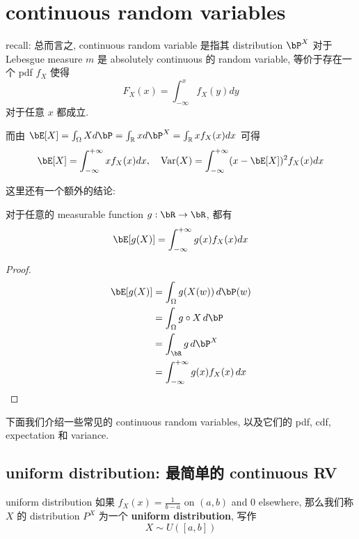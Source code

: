 \section{continuous random variables}
recall: 总而言之, continuous random variable 是指其 distribution \(\bP^X\)
对于 Lebesgue measure \(m\) 是 absolutely continuous 的 random variable, 
等价于存在一个 pdf \(f_X\) 使得\[
F_X(x) = \int_{-\infty}^x f_X(y) dy 
\] 对于任意 \(x\) 都成立.

而由 \( \bE[X]= \int_{\Omega} X d\bP = \int_{\mathbb{R}} x d\bP^X = \int_{\mathbb{R}} x f_X(x) dx \) 可得 
\[
\bE[X] = \int_{-\infty}^{+\infty} x f_X(x) dx, \quad \text{Var}(X) = \int_{-\infty}^{+\infty} (x-\bE[X])^2 f_X(x) dx
\]

这里还有一个额外的结论:
\begin{proposition}
     对于任意的 measurable function \(g: \bR \to \bR\), 都有
\[
\bE[g(X)] = \int_{-\infty}^{+\infty} g(x) f_X(x) dx
\]
\end{proposition}
\begin{proof}
\begin{align*}
\bE[g(X)] &= \int_{\Omega} g(X(w))\, d\bP(w) \\
&=  \int_{\Omega} g\circ X \, d\bP \\
&= \int_{\bR} g \, d\bP^X \\
&= \int_{-\infty}^{+\infty} g(x) f_X(x) \, dx
\end{align*}
\end{proof}

下面我们介绍一些常见的 continuous random variables, 以及它们的 pdf, cdf, expectation 和 variance.

\subsection{uniform distribution: 最简单的 continuous RV}
\begin{definition}{uniform distribution}
如果 \(f_X(x) = \frac{1}{b-a}\) on \((a,b)\) and \(0\) elsewhere,
那么我们称 \(X\) 的 distribution \(P^X\) 为一个 
\textbf{uniform distribution}, 写作
\[
X \sim U([a,b])
\]
\end{definition}

